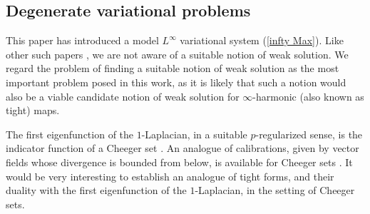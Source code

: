\documentclass[reqno,11pt]{amsart}
\newcommand{\dfn}[1]{\emph{#1}\index{#1}}
\newtheorem{conjecture}[theorem]{Conjecture}
\theoremstyle{definition}
\numberwithin{equation}{section}
\begin{document}



\subsection{Degenerate variational problems}
This paper has introduced a model $L^\infty$ variational system (\ref{infty Max}).
Like other such papers \cite{Barron08,Sheffield12,daskalopoulos2022}, we are not aware of a suitable notion of weak solution.
We regard the problem of finding a suitable notion of weak solution as the most important problem posed in this work, as it is likely that such a notion would also be a viable candidate notion of weak solution for $\infty$-harmonic (also known as tight) maps.

The first eigenfunction of the $1$-Laplacian, in a suitable $p$-regularized sense, is the indicator function of a Cheeger set \cite{Kawohl2003}.
An analogue of calibrations, given by vector fields whose divergence is bounded from below, is available for Cheeger sets \cite{Grieser05}.
It would be very interesting to establish an analogue of tight forms, and their duality with the first eigenfunction of the $1$-Laplacian, in the setting of Cheeger sets. 







\printbibliography
\end{document}
